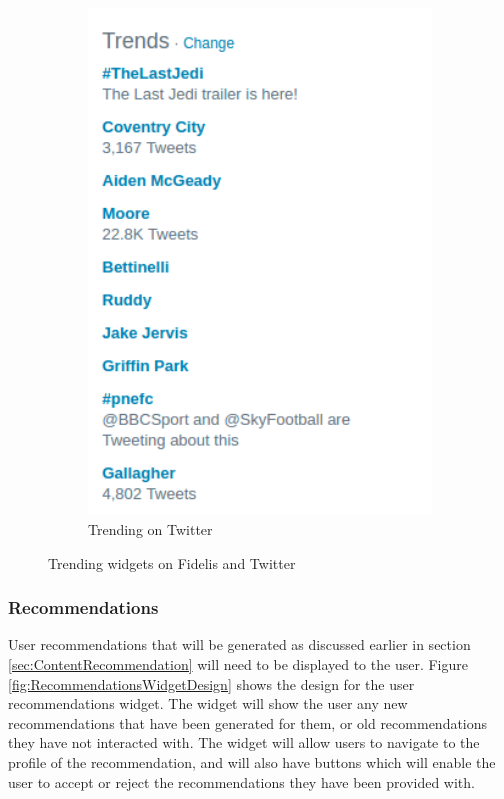 \begin{figure}[H]
\begin{subfigure}[b]{0.4\linewidth}
		\includegraphics[width=1\textwidth]{Images/Design/trending-twitter}
		\caption{Trending on Twitter}
		\label{fig:trending-twitter}
	\end{subfigure}
	\caption{Trending widgets on Fidelis and Twitter}
	\label{fig:TrendingWidgets}
\end{figure}

\subsubsection{Recommendations}
User recommendations that will be generated as discussed earlier in section \ref{sec:ContentRecommendation} will need to be displayed to the user. Figure \ref{fig:RecommendationsWidgetDesign} shows the design for the user recommendations widget. The widget will show the user any new recommendations that have been generated for them, or old recommendations they have not interacted with. The widget will allow users to navigate to the profile of the recommendation, and will also have buttons which will enable the user to accept or reject the recommendations they have been provided with.

